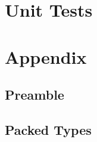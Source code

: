 

\section{Unit Tests}



\section{Appendix}
\subsection{Preamble}



\subsection{Packed Types}




